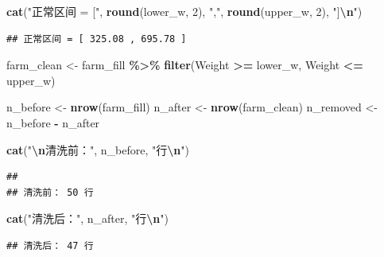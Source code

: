 \documentclass[
]{ctexart}
\newenvironment{Shaded}{\begin{snugshade}}{\end{snugshade}}
\newcommand{\DecValTok}[1]{\textcolor[rgb]{0.00,0.00,0.81}{#1}}
\newcommand{\FunctionTok}[1]{\textcolor[rgb]{0.13,0.29,0.53}{\textbf{#1}}}
\newcommand{\NormalTok}[1]{#1}
\newcommand{\OtherTok}[1]{\textcolor[rgb]{0.56,0.35,0.01}{#1}}
\newcommand{\SpecialCharTok}[1]{\textcolor[rgb]{0.81,0.36,0.00}{\textbf{#1}}}
\newcommand{\StringTok}[1]{\textcolor[rgb]{0.31,0.60,0.02}{#1}}
\begin{document}
\begin{Shaded}
\begin{Highlighting}[]
\FunctionTok{cat}\NormalTok{(}\StringTok{"正常区间 = ["}\NormalTok{, }\FunctionTok{round}\NormalTok{(lower\_w, }\DecValTok{2}\NormalTok{), }\StringTok{","}\NormalTok{, }\FunctionTok{round}\NormalTok{(upper\_w, }\DecValTok{2}\NormalTok{), }\StringTok{"]}\SpecialCharTok{\textbackslash{}n}\StringTok{"}\NormalTok{)}
\end{Highlighting}
\end{Shaded}

\begin{verbatim}
## 正常区间 = [ 325.08 , 695.78 ]
\end{verbatim}

\begin{Shaded}
\begin{Highlighting}[]
\NormalTok{farm\_clean }\OtherTok{\textless{}{-}}\NormalTok{ farm\_fill }\SpecialCharTok{\%\textgreater{}\%}
  \FunctionTok{filter}\NormalTok{(Weight }\SpecialCharTok{\textgreater{}=}\NormalTok{ lower\_w, Weight }\SpecialCharTok{\textless{}=}\NormalTok{ upper\_w)}

\NormalTok{n\_before  }\OtherTok{\textless{}{-}} \FunctionTok{nrow}\NormalTok{(farm\_fill)}
\NormalTok{n\_after   }\OtherTok{\textless{}{-}} \FunctionTok{nrow}\NormalTok{(farm\_clean)}
\NormalTok{n\_removed }\OtherTok{\textless{}{-}}\NormalTok{ n\_before }\SpecialCharTok{{-}}\NormalTok{ n\_after}

\FunctionTok{cat}\NormalTok{(}\StringTok{"}\SpecialCharTok{\textbackslash{}n}\StringTok{清洗前："}\NormalTok{, n\_before, }\StringTok{"行}\SpecialCharTok{\textbackslash{}n}\StringTok{"}\NormalTok{)}
\end{Highlighting}
\end{Shaded}

\begin{verbatim}
## 
## 清洗前： 50 行
\end{verbatim}

\begin{Shaded}
\begin{Highlighting}[]
\FunctionTok{cat}\NormalTok{(}\StringTok{"清洗后："}\NormalTok{, n\_after,  }\StringTok{"行}\SpecialCharTok{\textbackslash{}n}\StringTok{"}\NormalTok{)}
\end{Highlighting}
\end{Shaded}

\begin{verbatim}
## 清洗后： 47 行
\end{verbatim}
\end{document}

